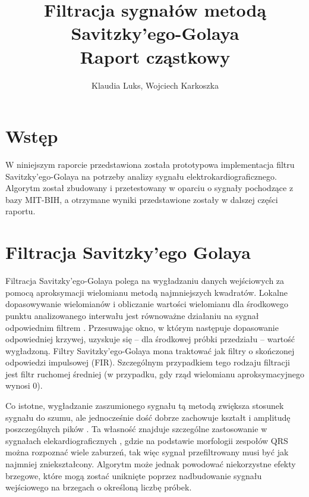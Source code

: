 \documentclass[a4paper]{article}
\title{Filtracja sygnałów metodą Savitzky'ego-Golaya \\ Raport cząstkowy}
\author{Klaudia Luks, Wojciech Karkoszka}
\date{\formatdate{22}{12}{2016}}
\begin{document}
\maketitle

\section{Wstęp}

W niniejszym raporcie przedstawiona została prototypowa implementacja filtru Savitzky'ego-Golaya na potrzeby analizy sygnału elektrokardiograficznego. Algorytm został zbudowany i przetestowany w oparciu o sygnały pochodzące z bazy MIT-BIH, a otrzymane wyniki przedstawione zostały w dalszej części raportu.


\section{Filtracja Savitzky'ego Golaya}

Filtracja Savitzky'ego-Golaya polega na wygładzaniu danych wejściowych za pomocą aproksymacji wielomianu metodą najmniejszych kwadratów. Lokalne dopasowywanie wielomianów i obliczanie wartości wielomianu dla środkowego punktu analizowanego interwału jest równoważne działaniu na sygnał odpowiednim filtrem \cite{on}. Przesuwając okno, w którym następuje dopasowanie odpowiedniej krzywej, uzyskuje się -- dla środkowej próbki przedziału -- wartość wygładzoną. Filtry Savitzky'ego-Golaya mona traktować jak filtry o skończonej odpowiedzi impulsowej (FIR). Szczególnym przypadkiem tego rodzaju filtracji jest filtr ruchomej średniej (w przypadku, gdy rząd wielomianu aproksymacyjnego wynosi 0).

Co istotne, wygładzanie zaszumionego sygnału tą metodą zwiększa stosunek sygnału do szumu, ale jednocześnie dość dobrze zachowuje kształt i amplitudę poszczególnych pików \cite{what}. Ta własność znajduje szczególne zastosowanie w sygnałach elekardiograficznych \cite{what}, gdzie na podstawie morfologii zespołów QRS można rozpoznać wiele zaburzeń, tak więc sygnał przefiltrowany musi być jak najmniej zniekształcony. Algorytm może jednak powodować niekorzystne efekty brzegowe, które mogą zostać uniknięte poprzez nadbudowanie sygnału wejściowego na brzegach o określoną liczbę próbek.
\end{document}

